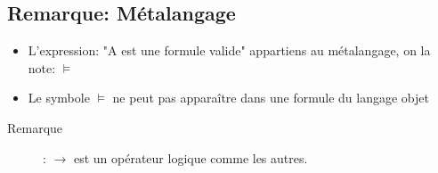 \documentclass[10pt,a4paper]{article}
\begin{document}
	\subsection{Remarque: Métalangage}
		\begin{itemize}
			\item L'expression: "A est une formule valide" appartiens au métalangage, on la note: $\vDash$
			\item Le symbole $\vDash$ ne peut pas apparaître dans une formule du langage objet
		\end{itemize}
		\begin{description}
			\item[Remarque]: $\rightarrow$ est un opérateur logique comme les autres.
		\end{description}				
\end{document}
